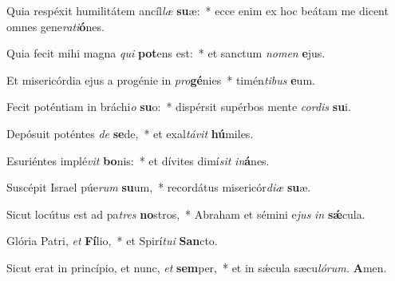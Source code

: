 \item Quia respéxit humilitátem ancíl\tinyhspace\textit{læ} \textbf{su}æ:~* ecce enim ex hoc beátam me dicent omnes gene\textit{rati}\textbf{ó}nes.
\item Quia fecit mihi magna \textit{qui} \textbf{pot}ens est:~* et san\-ctum \textit{nomen} \textbf{e}jus.
\item Et misericórdia ejus a progénie in \textit{pro}\tinyhspace\textbf{gé}nies~* timén\textit{tibus} \textbf{e}um.
\item Fecit poténtiam in bráchi\textit{o} \textbf{su}o:~* dispérsit supérbos mente \textit{cordis} \textbf{su}i.
\item Depósuit poténtes \textit{de} \textbf{se}de,~* et exal\textit{távit} \textbf{hú}miles.
\item Esuriéntes implé\textit{vit} \textbf{bo}nis:~* et dívites dimí\textit{sit} \textit{in}\textbf{á}nes.
\item Suscépit Israel púe\textit{rum} \textbf{su}um,~* recordátus misericór\textit{diæ} \textbf{su}æ.
\item Sicut locútus est ad pa\tinyhspace\textit{tres} \textbf{no}stros,~* Abraham et sémini e\textit{jus} \textit{in} \textbf{sǽ}cula.
\item Glória Patri, \textit{et} \textbf{Fí}lio,~* et Spirí\tinyhspace\textit{tui} \textbf{San}cto.
\item Sicut erat in princípio, et nunc, \textit{et} \textbf{sem}per,~* et in sǽcula sæcu\tinyhspace\textit{lórum.} \textbf{A}men.
